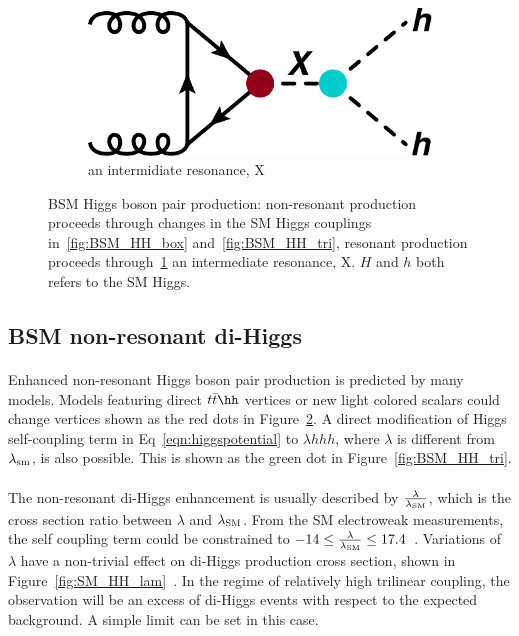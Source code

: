 \begin{figure}[h!]
\begin{subfigure}[b]{0.3\textwidth}
        \includegraphics[width=\textwidth]{figures/theory/BSM_HH_X}
        \caption{an intermidiate resonance, X}
        \label{fig:BSM_HH_X}
    \end{subfigure}
\caption{BSM Higgs boson pair production: non-resonant production proceeds through changes in the SM Higgs couplings in~\ref{fig:BSM_HH_box} and~\ref{fig:BSM_HH_tri}, resonant production proceeds through~\ref{fig:BSM_HH_X} an intermediate resonance, X. $H$ and $h$ both refers to the SM Higgs.}
\label{fig:BSM_HH}
\end{figure}

\subsection{BSM non-resonant di-Higgs}
\paragraph{}
Enhanced non-resonant Higgs boson pair production is predicted by many models. Models featuring direct $t\bar{t}\hh$ vertices \cite{Grober:2010yv, Contino:2012xk} or new light colored scalars \cite{PhysRevD.86.095023} could change vertices shown as the red dots in Figure~\ref{fig:BSM_HH}. A direct modification of Higgs self-coupling term in Eq~\ref{eqn:higgspotential} to $\lambda hhh$, where $\lambda$ is different from $\lambda_{\rm sm}$, is also possible. This is shown as the green dot in Figure~\ref{fig:BSM_HH_tri}. 

\paragraph{}
The non-resonant di-Higgs enhancement is usually described by $\frac{\rm \lambda}{\rm \lambda_{\rm SM}}$, which is the cross section ratio between $\lambda$ and $\lambda_{\rm SM}$. From the SM electroweak measurements, the self coupling term could be constrained to $-14 \leq \frac{\rm \lambda}{\rm \lambda_{\rm SM}} \leq 17.4$~\cite{Kribs:2017znd}. Variations of $\lambda$ have a non-trivial effect on di-Higgs production cross section, shown in Figure~\ref{fig:SM_HH_lam}~\cite{Frederix:2014hta}. In the regime of relatively high trilinear coupling, the observation will be an excess of di-Higgs events with respect to the expected background. A simple limit can be set in this case.

